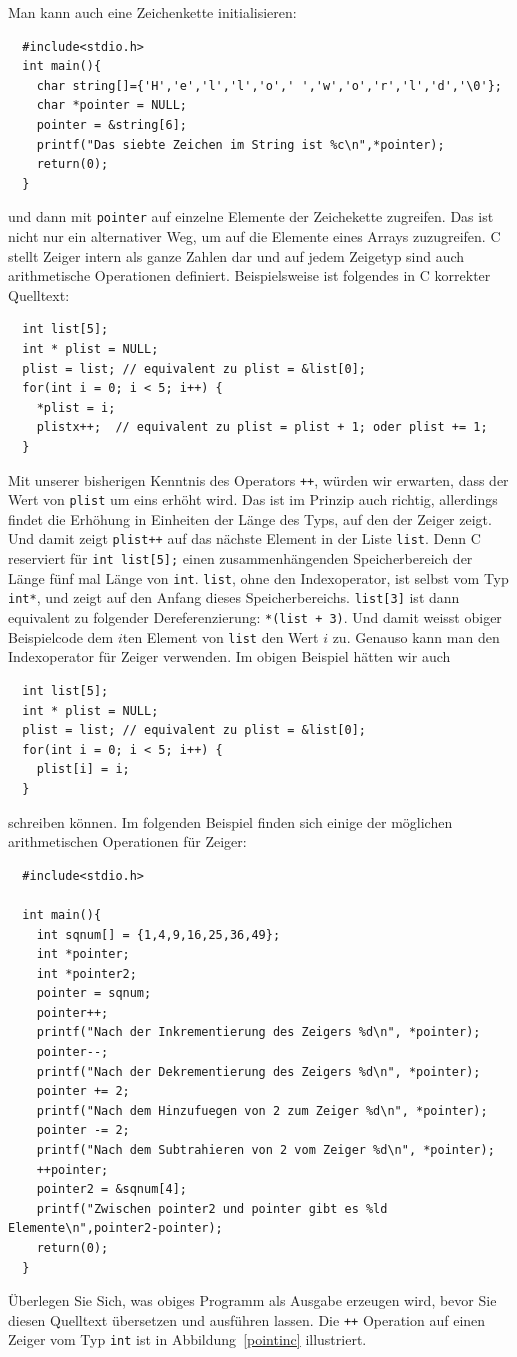 Man kann auch eine Zeichenkette initialisieren:
\begin{lstlisting}
  #include<stdio.h>
  int main(){
    char string[]={'H','e','l','l','o',' ','w','o','r','l','d','\0'};
    char *pointer = NULL;
    pointer = &string[6];
    printf("Das siebte Zeichen im String ist %c\n",*pointer);
    return(0);
  }
\end{lstlisting} 
und dann mit \verb|pointer| auf einzelne Elemente der Zeichekette zugreifen.
Das ist nicht nur ein alternativer Weg, um auf die Elemente eines Arrays zuzugreifen.
C stellt Zeiger intern als ganze Zahlen dar und auf jedem Zeigetyp sind auch arithmetische Operationen definiert.
Beispielsweise ist folgendes in C korrekter Quelltext:
\begin{lstlisting}
  int list[5];
  int * plist = NULL;
  plist = list; // equivalent zu plist = &list[0];
  for(int i = 0; i < 5; i++) {
    *plist = i;
    plistx++;  // equivalent zu plist = plist + 1; oder plist += 1;
  }
\end{lstlisting}
Mit unserer bisherigen Kenntnis des Operators \verb|++|, würden wir erwarten, dass der Wert von \verb|plist| um eins erhöht wird.
Das ist im Prinzip auch richtig, allerdings findet die Erhöhung in Einheiten der Länge des Typs, auf den der Zeiger zeigt.
Und damit zeigt \verb|plist++| auf das nächste Element in der Liste \verb|list|.
Denn C reserviert für \verb|int list[5];| einen zusammenhängenden Speicherbereich der Länge fünf mal Länge von \verb|int|.
\verb|list|, ohne den Indexoperator, ist selbst vom Typ \verb|int*|, und zeigt auf den Anfang dieses Speicherbereichs. 
\verb|list[3]| ist dann equivalent zu folgender Dereferenzierung: \verb|*(list + 3)|.
Und damit weisst obiger Beispielcode dem $i$ten Element von \verb|list| den Wert $i$ zu.
Genauso kann man den Indexoperator für Zeiger verwenden.
Im obigen Beispiel hätten wir auch
\begin{lstlisting}
  int list[5];
  int * plist = NULL;
  plist = list; // equivalent zu plist = &list[0];
  for(int i = 0; i < 5; i++) {
    plist[i] = i;
  }
\end{lstlisting}
schreiben können.
Im folgenden Beispiel finden sich einige der möglichen arithmetischen Operationen für Zeiger:
\begin{lstlisting}
  #include<stdio.h>

  int main(){
    int sqnum[] = {1,4,9,16,25,36,49};
    int *pointer;
    int *pointer2;
    pointer = sqnum;
    pointer++;
    printf("Nach der Inkrementierung des Zeigers %d\n", *pointer);
    pointer--;
    printf("Nach der Dekrementierung des Zeigers %d\n", *pointer);
    pointer += 2;
    printf("Nach dem Hinzufuegen von 2 zum Zeiger %d\n", *pointer);
    pointer -= 2;
    printf("Nach dem Subtrahieren von 2 vom Zeiger %d\n", *pointer);   
    ++pointer;
    pointer2 = &sqnum[4];
    printf("Zwischen pointer2 und pointer gibt es %ld Elemente\n",pointer2-pointer);
    return(0);
  }
\end{lstlisting}
Überlegen Sie Sich, was obiges Programm als Ausgabe erzeugen wird, bevor Sie diesen Quelltext übersetzen und ausführen lassen.
Die \verb|++| Operation auf einen Zeiger vom Typ \verb|int| ist in Abbildung~\ref{pointinc} illustriert.

